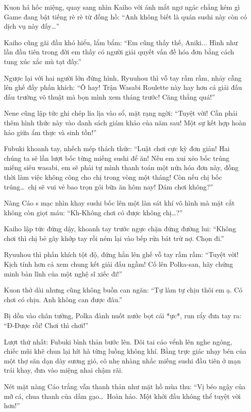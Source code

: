 \documentclass[../main.tex]{subfiles}
\begin{document}
Kuon há hốc miệng, quay sang nhìn Kaiho với ánh mắt ngơ ngác chẳng kém gì Game đang bật tiếng rè rè từ đồng hồ: ``Anh không biết là quán sushi này còn có dịch vụ này đấy\dots''

Kaiho cũng gãi đầu khó hiểu, lẩm bẩm: ``Em cũng thấy thế, Aniki... Hình như lần đầu tiên trong đời em thấy có người giải quyết vấn đề hóa đơn bằng cách tung xúc xắc mù tạt đấy.''

Ngược lại với hai người lớn đứng hình, Ryuuhou thì vỗ tay rầm rầm, nhảy cẫng lên ghế đầy phấn khích: ``Ô hay! Trận Wasabi Roulette này hay hơn cả giải đấu đấu trường võ thuật mà bọn mình xem tháng trước! Căng thẳng quá!''

Nene cũng lập tức ghi chép lia lịa vào sổ, mặt rạng ngời: ``Tuyệt vời! Cần phải thêm hình thức này vào danh sách giám khảo của năm sau! Một sự kết hợp hoàn hảo giữa ẩm thực và sinh tồn!''

Fubuki khoanh tay, nhếch mép thách thức: ``Luật chơi cực kỳ đơn giản! Hai chúng ta sẽ lần lượt bốc từng miếng sushi để ăn! Nếu em xui xẻo bốc trúng miếng siêu wasabi, em sẽ phải tự mình thanh toán một nửa hóa đơn này, đồng thời làm việc không công cho chị trong vòng một tháng! Còn nếu chị bốc trúng\dots\ chị sẽ vui vẻ bao trọn gói bữa ăn hôm nay! Dám chơi không?''

Nàng Cáo s mạc nhìn khay sushi bốc lên một làn sát khí vô hình mà mặt cắt không còn giọt máu: ``Kh-Không chơi có được không chị\dots?''

Kaiho lập tức đứng dậy, khoanh tay trước ngực chặn đứng đường lui: ``Không chơi thì chị bẻ gãy khớp tay rồi ném lại vào bếp rửa bát trừ nợ. Chọn đi.''

Ryuuhou thì phấn khích tột độ, đứng hẳn lên ghế vỗ tay rầm rầm: ``Tuyệt vời! Kịch tính hơn cả xem chung kết giải đấu ngầm! Cố lên Polka-san, hãy chứng minh bản lĩnh của một nghệ sĩ xiếc đi!''

Kuon thở dài nhưng cũng không buồn can ngăn: ``Tự làm tự chịu thôi em ạ. Có chơi có chịu. Anh không can được đâu.''

Bị dồn vào chân tường, Polka đành nuốt nước bọt cái *ực*, run rẩy đưa tay ra: ``Đ-Được rồi! Chơi thì chơi!''

Lượt thứ nhất: Fubuki bình thản bước lên. Đôi tai cáo vểnh lên nghe ngóng, chiếc mũi khẽ chun lại hít hà từng luồng không khí. Bằng trực giác nhạy bén của một thợ săn dạn dày sương gió, cô nhẹ nhàng nhấc miếng sushi đầu tiên ở mạn trái khay, đưa vào miệng nhai chậm rãi.

Nét mặt nàng Cáo trắng vẫn thanh thản như mặt hồ mùa thu: ``Vị béo ngậy của mỡ cá, chua thanh của dấm gạo\dots\ Hoàn hảo. Một khởi đầu không thể tuyệt vời hơn!''
\end{document}
